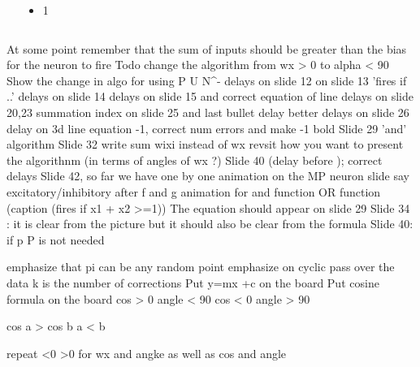\documentclass[serif, aspectratio=169]{beamer}
\begin{document}
\begin{frame}
\begin{columns}

\begin{overlayarea}{\textwidth}{\textheight}
\end{overlayarea}

\begin{overlayarea}{\textwidth}{\textheight}
\begin{itemize}\justifying
\item 1
\end{itemize}
\end{overlayarea}
\end{columns}
\end{frame}
At some point remember that the sum of inputs should be greater than the bias for the neuron to fire
Todo change the algorithm from wx > 0 to alpha < 90
Show the change in algo for using P U N^- 
delays on slide 12
on slide 13 'fires if ..'
delays on slide 14
delays on slide 15 and correct equation of line
delays on slide 20,23
summation index on slide 25 and last bullet delay
better delays on slide 26
delay on 3d line equation -1, correct num errors and make -1 bold
Slide 29 'and' algorithm 
Slide 32 write sum wixi instead of wx
revsit how you want to present the algorithnm (in terms of angles of wx ?)
Slide 40 (delay before \because); correct delays
Slide 42, so far we have 
one by one animation on the MP neuron slide
say excitatory/inhibitory after f and g
animation for and function
OR function (caption (fires if x1 + x2 >=1))
The equation should appear on slide 29
Slide 34 : it is clear from the picture but it should also be clear from the formula
Slide 40: if p \in P is not needed

emphasize that pi can be any random point
emphasize on cyclic pass over the data
k is the number of corrections
Put y=mx +c on the board
Put cosine formula on the board
cos > 0 angle < 90
cos < 0 angle > 90

cos a > cos b
a < b

repeat <0 >0 for wx and angke as well as cos and angle
\fi
\end{document}
